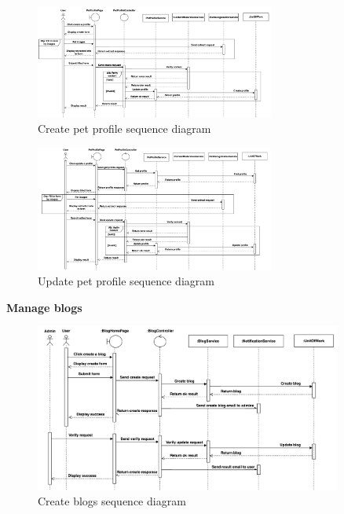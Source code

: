 \begin{figure}[H]
  \centering
  \includegraphics[angle=-90,width=0.7\textwidth]{Figures/manage_pet_seq.png}
  \caption{Create pet profile sequence diagram}
  \label{fig:manage-pet-seq}
\end{figure}
\clearpage
\begin{figure}[H]
  \centering
  \includegraphics[angle=-90,width=0.7\textwidth]{Figures/update_pet_profile_seq.png}
  \caption{Update pet profile sequence diagram}
  \label{fig:access-pet-seq}
\end{figure}
\clearpage

\textbf{Manage blogs}

\begin{figure}[H]
  \centering
  \includegraphics[width=0.9\textwidth]{Figures/manage_blog_seq.png}
  \caption{Create blogs sequence diagram}
  \label{fig:manage-blog-seq}
\end{figure}

